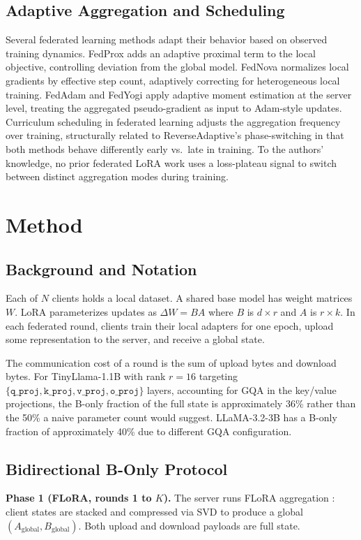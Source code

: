 \subsection{Adaptive Aggregation and Scheduling}
Several federated learning methods adapt their behavior based on observed training dynamics. FedProx \citep{li2020fedprox} adds an adaptive proximal term to the local objective, controlling deviation from the global model. FedNova \citep{wang2020fednova} normalizes local gradients by effective step count, adaptively correcting for heterogeneous local training. FedAdam and FedYogi \citep{reddi2020adaptive} apply adaptive moment estimation at the server level, treating the aggregated pseudo-gradient as input to Adam-style updates. Curriculum scheduling in federated learning adjusts the aggregation frequency over training, structurally related to ReverseAdaptive's phase-switching in that both methods behave differently early vs.\ late in training. To the authors' knowledge, no prior federated LoRA work uses a loss-plateau signal to switch between distinct aggregation modes during training.

\section{Method}
\label{sec:method}

\subsection{Background and Notation}
Each of $N$ clients holds a local dataset. A shared base model has weight matrices $W$. LoRA \citep{hu2022lora} parameterizes updates as $\Delta W = BA$ where $B$ is $d \times r$ and $A$ is $r \times k$. In each federated round, clients train their local adapters for one epoch, upload some representation to the server, and receive a global state.

The communication cost of a round is the sum of upload bytes and download bytes. For TinyLlama-1.1B with rank $r{=}16$ targeting $\{\texttt{q\_proj}, \texttt{k\_proj}, \texttt{v\_proj}, \texttt{o\_proj}\}$ layers, accounting for GQA in the key/value projections, the B-only fraction of the full state is approximately 36\% rather than the 50\% a naive parameter count would suggest. LLaMA-3.2-3B has a B-only fraction of approximately 40\% due to different GQA configuration.

\subsection{Bidirectional B-Only Protocol}
\textbf{Phase 1 (FLoRA, rounds 1 to $K$).}
The server runs FLoRA aggregation \citep{wang2024flora}: client states are stacked and compressed via SVD to produce a global $(A_{\text{global}}, B_{\text{global}})$. Both upload and download payloads are full state.

